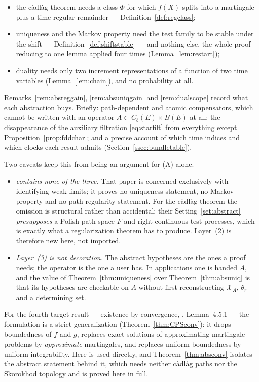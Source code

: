\documentclass[11pt,a4paper]{article}
\theoremstyle{plain}
\theoremstyle{definition}
\theoremstyle{remark}
\newcommand{\Bdd}{B}                           %
\newcommand{\Cb}{C_b}                          %
\newcommand{\XX}{\mathcal{X}}                  %
\newcommand{\EK}{\cite{EK86}}
\newcommand{\CPS}{\cite{CPS23}}
\begin{document}
\begin{itemize}
\item the c\`adl\`ag theorem needs a class $\Phi$ for which $f(X)$ splits into a
  martingale plus a time-regular remainder --- Definition~\ref{def:regclass};
\item uniqueness and the Markov property need the test family to be stable under
  the shift --- Definition~\ref{def:shiftstable} --- and nothing else, the whole
  proof reducing to one lemma applied four times (Lemma~\ref{lem:restart});
\item duality needs only two increment representations of a function of two time
  variables (Lemma~\ref{lem:chain}), and no probability at all.
\end{itemize}

\noindent
Remarks~\ref{rem:absreggain}, \ref{rem:absuniqgain} and \ref{rem:dualscope}
record what each abstraction buys.  Briefly: path-dependent and atomic
compensators, which cannot be written with an operator
$A \subset \Cb(E) \times \Bdd(E)$ at all; the disappearance of the auxiliary
filtration \eqref{eq:starfilt} from everything except
Proposition~\ref{prop:fddchar}; and a precise account of which time indices and
which clocks each result admits (Section~\ref{ssec:bundletable}).

Two caveats keep this from being an argument for (A) alone.

\begin{itemize}
\item \emph{\CPS{} contains none of the three.}  That paper is concerned
  exclusively with identifying weak limits; it proves no uniqueness statement, no
  Markov property and no path regularity statement.  For the c\`adl\`ag theorem
  the omission is structural rather than accidental: their Setting~\ref{set:abstract}
  \emph{presupposes} a Polish path space $F$ and right continuous test processes,
  which is exactly what a regularization theorem has to produce.  Layer~(2) is
  therefore new here, not imported.
\item \emph{Layer~(3) is not decoration.}  The abstract hypotheses are the ones a
  proof needs; the operator is the one a user has.  In applications one is handed
  $A$, and the value of Theorem~\ref{thm:uniqueness} over
  Theorem~\ref{thm:absuniq} is that its hypotheses are checkable on $A$ without
  first reconstructing $\XX_A$, $\theta_r$ and a determining set.
\end{itemize}

For the fourth target result --- existence by convergence, \EK, Lemma~4.5.1 ---
the \CPS{} formulation is a strict generalization (Theorem~\ref{thm:CPSconv}): it
drops boundedness of $f$ and $g$, replaces exact solutions of approximating
martingale problems by \emph{approximate} martingales, and replaces uniform
boundedness by uniform integrability.  Here \CPS{} is used directly, and
Theorem~\ref{thm:absconv} isolates the abstract statement behind it, which needs
neither c\`adl\`ag paths nor the Skorokhod topology and is proved here in full.
\end{document}
